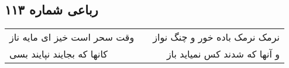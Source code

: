 \begin{center}
\section*{رباعی شماره ۱۱۳}
\label{sec:sh113}
\begin{longtable}{l p{0.5cm} r}
وقت سحر است خیز ای مایه ناز
&&
نرمک نرمک باده خور و چنگ نواز
\\
کانها که بجایند نپایند بسی
&&
و آنها که شدند کس نمیاید باز
\\
\end{longtable}
\end{center}
